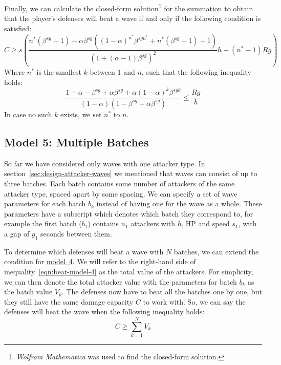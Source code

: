 Finally, we can calculate the closed-form solution\footnote{\emph{Wolfram Mathematica} was used to find the closed-form solution.} for the summation to obtain that the player's defenses will beat a wave if and only if the following condition is satisfied:
\begin{equation}\label{eqn:beat-model-4}
    C \geq s\left(\frac{
    n^*(\beta^{sg}-1) - \alpha\beta^{sg}((1-\alpha)^{n^*}\beta^{sgn^*} + n^*(\beta^{sg}-1) - 1)
    }{
        (1+(\alpha-1)\beta^{sg})^2
    }h
    - (n^*-1)Rg
    \right)
\end{equation}
Where $n^*$ is the smallest $k$ between 1 and $n$, such that the following inequality holds:
\begin{equation}
    \frac{
        1-\alpha-\beta^{sg}+\alpha\beta^{sg}+\alpha(1-\alpha)^k\beta^{sgk}
    }{
        (1-\alpha)(1-\beta^{sg}+\alpha\beta^{sg})
    } \leq \frac{Rg}{h}
\end{equation}
In case no such $k$ exists, we set $n^*$ to $n$.

\subsection{Model 5: Multiple Batches}
So far we have considered only waves with one attacker type.
In section~\ref{sec:design-attacker-waves} we mentioned that waves can consist of up to three batches.
Each batch contains some number of attackers of the same attacker type, spaced apart by some spacing.
We can specify a set of wave parameters for each batch $b_k$ instead of having one for the wave as a whole.
These parameters have a subscript which denotes which batch they correspond to, for example the first batch ($b_1$) contains $n_1$ attackers with $h_1$\,HP and speed $s_1$, with a gap of $g_1$ seconds between them.

To determine which defenses will beat a wave with $N$ batches, we can extend the condition for \hyperref[sec:analysis-waves-aoe]{model~4}.
We will refer to the right-hand side of inequality~\ref{eqn:beat-model-4} as the total value of the attackers.
For simplicity, we can then denote the total attacker value with the parameters for batch $b_k$ as the batch value $V_k$.
The defenses now have to beat all the batches one by one, but they still have the same damage capacity $C$ to work with.
So, we can say the defenses will beat the wave when the following inequality holds:
\begin{equation}
    C \geq \sum_{k=1}^{N} V_k
\end{equation}


